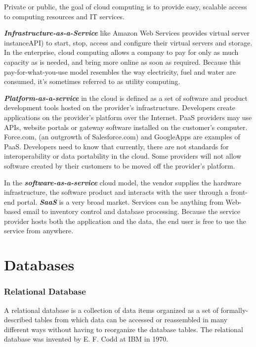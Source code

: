 Private or public, the goal of cloud computing is to provide easy, scalable access to computing resources and IT services.


\textbf{\emph{Infrastructure-as-a-Service}} like Amazon Web Services provides virtual server instanceAPI) to start, stop, access and configure their virtual servers and storage. In the enterprise, cloud computing allows a company to pay for only as much capacity as is needed, and bring more online as soon as required. Because this pay-for-what-you-use model resembles the way electricity, fuel and water are consumed, it's sometimes referred to as utility computing.


\textbf{\emph{Platform-as-a-service}} in the cloud is defined as a set of software and product development tools hosted on the provider's infrastructure. Developers create applications on the provider's platform over the Internet. PaaS providers may use APIs, website portals or gateway software installed on the customer's computer. Force.com, (an outgrowth of Salesforce.com) and GoogleApps are examples of PaaS. Developers need to know that currently, there are not standards for interoperability or data portability in the cloud. Some providers will not allow software created by their customers to be moved off the provider's platform.


In the \textbf{\emph{software-as-a-service}} cloud model, the vendor supplies the hardware infrastructure, the software product and interacts with the user through a front-end portal. \textbf{\emph{SaaS}} is a very broad market. Services can be anything from Web-based email to inventory control and database processing. Because the service provider hosts both the application and the data, the end user is free to use the service from anywhere.





\chapter{Databases}
\subsection{Relational Database}
A relational database is a collection of data items organized as a set of formally-described tables from which data can be accessed or reassembled in many different ways without having to reorganize the database tables. The relational database was invented by E. F. Codd at IBM in 1970.

